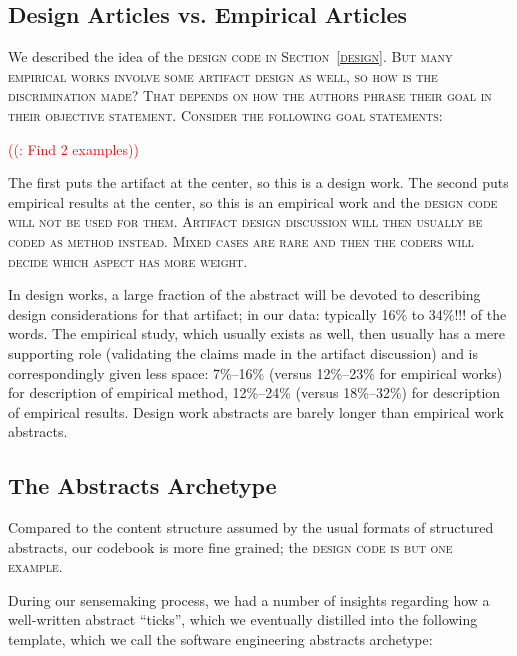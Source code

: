 \documentclass[10pt,journal,compsoc]{IEEEtran}
\newcommand{\Cb}[1]{\bgroup\scshape #1\egroup}  %
\newcounter{todonumber}
\newcommand{\Todo}[1]{\stepcounter{todonumber}\textcolor{red}{\sffamily ((\arabic{todonumber}: #1))}}
\begin{document}
\subsection{Design Articles vs. Empirical Articles}

We described the idea of the \Cb{design} code in Section~\ref{design}.
But many empirical works involve some artifact design as well,
so how is the discrimination made?
That depends on how the authors phrase their goal in their
\Cb{objective} statement.
Consider the following goal statements:

\Todo{Find 2 examples}

The first puts the artifact at the center, so this is a design work.
The second puts empirical results at the center, so this is an empirical work
and the \Cb{design} code will not be used for them.
Artifact design discussion will then usually be coded as \Cb{method} instead.
Mixed cases are rare and then the coders will decide which aspect has more weight.

In design works, a large fraction of the abstract will be devoted to
describing design considerations for that artifact;
in our data: typically 16\% to 34\%!!! of the words.
The empirical study, which usually exists as well, then usually has a mere
supporting role (validating the claims made in the artifact discussion)
and is correspondingly given less space:
7\%--16\% (versus 12\%--23\% for empirical works) for description of empirical method,
12\%--24\% (versus 18\%--32\%) for description of empirical results.
Design work abstracts are barely longer than empirical work abstracts.


\subsection{The Abstracts Archetype}\label{archetype}

Compared to the content structure assumed by the usual formats of
structured abstracts, our codebook is more fine grained;
the \Cb{design} code is but one example.

During our sensemaking process, we had a number of insights regarding
how a well-written abstract ``ticks'', which we eventually distilled into
the following template, which we call the software engineering abstracts archetype:
\end{document}
